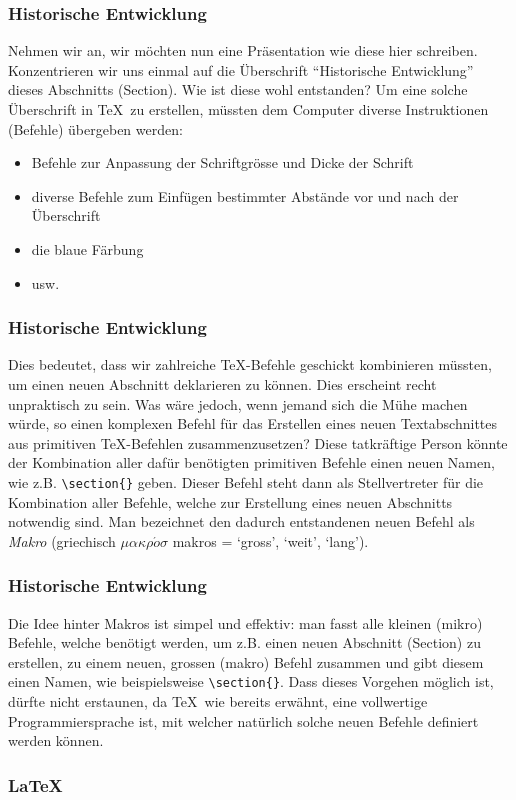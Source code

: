 \begin{frame}[fragile]
\frametitle{Historische Entwicklung}
Nehmen wir an, wir möchten nun eine Präsentation wie diese hier schreiben. Konzentrieren wir uns einmal auf die Überschrift \enquote{Historische Entwicklung} dieses Abschnitts (Section). Wie ist diese wohl entstanden? 
Um eine solche Überschrift in \TeX\ zu erstellen, müssten dem Computer diverse Instruktionen (Befehle) übergeben werden:
\begin{itemize}
\item Befehle zur Anpassung der Schriftgrösse und Dicke der Schrift
\item diverse Befehle zum Einfügen bestimmter Abstände vor und nach der Überschrift
\item die blaue Färbung
\item usw.
\end{itemize}
\end{frame}

\begin{frame}[fragile]
\frametitle{Historische Entwicklung}
Dies bedeutet, dass wir zahlreiche \TeX-Befehle geschickt kombinieren müssten, um einen neuen Abschnitt deklarieren zu können. Dies erscheint recht unpraktisch zu sein. Was wäre jedoch, wenn jemand sich die Mühe machen würde, so einen komplexen Befehl für das Erstellen eines neuen Textabschnittes aus primitiven \TeX-Befehlen zusammenzusetzen? Diese tatkräftige Person könnte der Kombination aller dafür benötigten primitiven Befehle einen neuen Namen, wie z.B. \lstinline[style=LaTeX]|\section{}| geben. Dieser Befehl steht dann als Stellvertreter für die Kombination aller Befehle, welche zur Erstellung eines neuen Abschnitts notwendig sind. Man bezeichnet den dadurch entstandenen neuen Befehl als \textit{Makro} (griechisch $\mu\alpha\kappa\rho\acute{o}\sigma$ makros = `gross', `weit', `lang').
\end{frame}


\begin{frame}[fragile]
\frametitle{Historische Entwicklung}
Die Idee hinter Makros ist simpel und effektiv: man fasst alle kleinen (mikro) Befehle, welche benötigt werden, um z.B. einen neuen Abschnitt (Section) zu erstellen, zu einem neuen, grossen (makro) Befehl zusammen und gibt diesem einen Namen, wie beispielsweise \lstinline[style=LaTeX]|\section{}|. Dass dieses Vorgehen möglich ist, dürfte nicht erstaunen, da \TeX\, wie bereits erwähnt, eine vollwertige Programmiersprache ist, mit welcher natürlich solche neuen Befehle definiert werden können.
\subsubsection{\LaTeX}
\end{frame}


